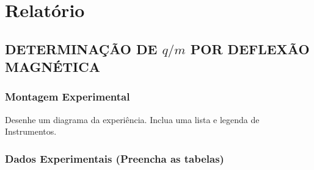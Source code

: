 \documentclass[a4paper,12pt]{article}  %
\begin{document}
\section{\sf Relatório}
\subsection{\sf DETERMINAÇÃO DE $q/m$ POR  DEFLEXÃO MAGNÉTICA}
\subsubsection{\sf Montagem Experimental}
Desenhe um diagrama da experiência. Inclua uma lista e legenda de Instrumentos.
\begin{center}
\framebox[18cm]{\rule{0pt}{6.5cm}}
\end{center}




\subsubsection{\sf Dados Experimentais (Preencha as tabelas)}
\end{document}
